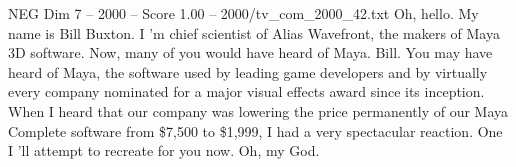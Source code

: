 \begin{textsample}{NEG Dim 7 – 2000 – Score 1.00 – 2000/tv\_com\_2000\_42.txt}  \label{ex:f7_neg_044}
Oh, hello.
My name is Bill Buxton.
I 'm chief scientist of Alias Wavefront, the makers of Maya 3D software.
Now, many of you would have heard of Maya.
Bill.
You may have heard of Maya, the software used by leading game developers and by virtually every company nominated for a major visual effects award since its inception.
When I heard that our company was lowering the price permanently of our Maya Complete software from \$7,500 to \$1,999, I had a very spectacular reaction.
One I 'll attempt to recreate for you now.
Oh, my God.

\end{textsample}

